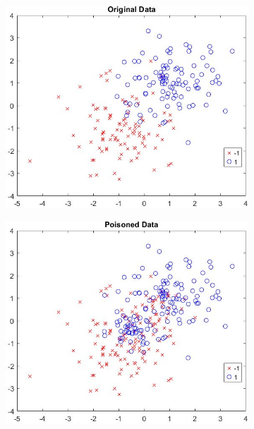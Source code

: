 \begin{figure}[H]
    \centering
    \begin{subfigure}[t]{0.45\textwidth}
        \centering
        \includegraphics[width=\textwidth]{media/ict2/image226}
    \end{subfigure}
    \begin{subfigure}[t]{0.45\textwidth}
        \centering
        \includegraphics[width=\textwidth]{media/ict2/image227}
    \end{subfigure}
    \begin{subfigure}[t]{0.45\textwidth}

\end{subfigure}
\end{figure}
